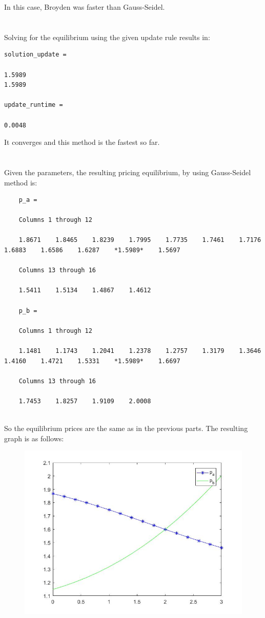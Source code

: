 \documentclass[12pt,oneside,reqno]{article}
\theoremstyle{definition}
\theoremstyle{definition}
\theoremstyle{definition}
\theoremstyle{definition}
\theoremstyle{definition}
\theoremstyle{definition}
\theoremstyle{definition}
\theoremstyle{definition}
\theoremstyle{definition}
\begin{document}
In this case, Broyden was faster than Gauss-Seidel.

	\section{}

Solving for the equilibrium using the given update rule results in:

\begin{lstlisting}
solution_update =

1.5989
1.5989

update_runtime =

0.0048

\end{lstlisting}

It converges and this method is the fastest so far. 
\newpage

	\section{}

Given the parameters, the resulting pricing equilibrium, by using Gauss-Seidel method is:

\begin{lstlisting}
	p_a =
	
	Columns 1 through 12
	
	1.8671    1.8465    1.8239    1.7995    1.7735    1.7461    1.7176    1.6883    1.6586    1.6287    *1.5989*    1.5697
	
	Columns 13 through 16
	
	1.5411    1.5134    1.4867    1.4612
	
	p_b =
	
	Columns 1 through 12
	
	1.1481    1.1743    1.2041    1.2378    1.2757    1.3179    1.3646    1.4160    1.4721    1.5331    *1.5989*    1.6697
	
	Columns 13 through 16
	
	1.7453    1.8257    1.9109    2.0008
	
\end{lstlisting}

So the equilibrium prices are the same as in the previous parts. The resulting graph is as follows:

\begin{figure}[!h]
	\centering
	\includegraphics[width=0.7\linewidth]{q5}
	\caption{}
	\label{}
\end{figure}
\end{document}
